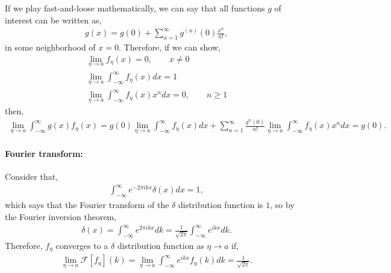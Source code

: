 \documentclass[10pt]{article}
\newcommand{\1}{\mathbf 1}
\begin{document}
If we play fast-and-loose mathematically, we can say that all functions $g$ of interest can be written as,
\begin{align}
	g(x)
	=
	g(0)
	+
	\sum_{n=1}^\infty g^{(n)}(0) \frac{x^n}{n!},
\end{align}
in some neighborhood of $x = 0$.
Therefore, if we can show,
\begin{gather}
	\lim_{\eta \to a}
	f_\eta(x) = 0, \qquad x \ne 0
	\\
	\lim_{\eta \to a}
	\int_{-\infty}^\infty
	f_\eta(x)
	dx
	=
	1\\
	\lim_{\eta \to a}
	\int_{-\infty}^\infty
	f_\eta(x)
	x^n
	dx
	= 0, \qquad n \geq 1
\end{gather}
then,
\begin{align}
	\lim_{\eta \to a}\int_{-\infty}^\infty g(x) f_\eta (x)
	=
	g(0)
	\lim_{\eta \to a}
	\int_{-\infty}^\infty
	f_\eta(x)
	dx
	+
	\sum_{n=1}^\infty \frac{g^{n}(0)}{n!}
	\lim_{\eta \to a} \int_{-\infty}^\infty f_\eta(x) x^n dx
	=
	g(0).
\end{align}

\paragraph{Fourier transform:}

Consider that,
\begin{align}
	\int_{-\infty}^\infty e^{-2\pi ikx} \delta(x) dx
	=
	1,
\end{align}
which says that the Fourier transform of the $\delta$ distribution function is $1$, so by the Fourier inversion theorem,
\begin{align}
	\delta(x)
	=
	\int_{-\infty}^\infty e^{2\pi ikx}dk
	=
	\frac{1}{\sqrt{2\pi}}
	\int_{-\infty}^{\infty}
	e^{ikx}
	dk.
\end{align}
Therefore, $f_\eta$ converges to a $\delta$ distribution function as $\eta \to a$ if,
\begin{align}
	\lim_{\eta \to a}
	\mathcal{F}[f_\eta](k)
	=
	\lim_{\eta \to a}
	\int_{-\infty}^\infty 
	e^{ikx} f_\eta(k)dk
	=
	\frac{1}{\sqrt{2\pi}}.
\end{align}


\end{document}
